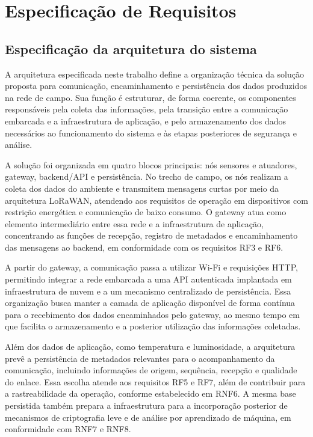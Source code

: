 \chapter{Especificação de Requisitos} \label{cap:especificacao}


\section{Especificação da arquitetura do sistema}
\label{sec:requisitos_infra}

A arquitetura especificada neste trabalho define a organização técnica da solução proposta para comunicação, encaminhamento e persistência dos dados produzidos na rede de campo. Sua função é estruturar, de forma coerente, os componentes responsáveis pela coleta das informações, pela transição entre a comunicação embarcada e a infraestrutura de aplicação, e pelo armazenamento dos dados necessários ao funcionamento do sistema e às etapas posteriores de segurança e análise.

A solução foi organizada em quatro blocos principais: nós sensores e atuadores, gateway, backend/API e persistência. No trecho de campo, os nós realizam a coleta dos dados do ambiente e transmitem mensagens curtas por meio da arquitetura LoRaWAN, atendendo aos requisitos de operação em dispositivos com restrição energética e comunicação de baixo consumo. O gateway atua como elemento intermediário entre essa rede e a infraestrutura de aplicação, concentrando as funções de recepção, registro de metadados e encaminhamento das mensagens ao backend, em conformidade com os requisitos RF3 e RF6.

A partir do gateway, a comunicação passa a utilizar Wi-Fi e requisições HTTP, permitindo integrar a rede embarcada a uma API autenticada implantada em infraestrutura de nuvem e a um mecanismo centralizado de persistência. Essa organização busca manter a camada de aplicação disponível de forma contínua para o recebimento dos dados encaminhados pelo gateway, ao mesmo tempo em que facilita o armazenamento e a posterior utilização das informações coletadas.

Além dos dados de aplicação, como temperatura e luminosidade, a arquitetura prevê a persistência de metadados relevantes para o acompanhamento da comunicação, incluindo informações de origem, sequência, recepção e qualidade do enlace. Essa escolha atende aos requisitos RF5 e RF7, além de contribuir para a rastreabilidade da operação, conforme estabelecido em RNF6. A mesma base persistida também prepara a infraestrutura para a incorporação posterior de mecanismos de criptografia leve e de análise por aprendizado de máquina, em conformidade com RNF7 e RNF8.

